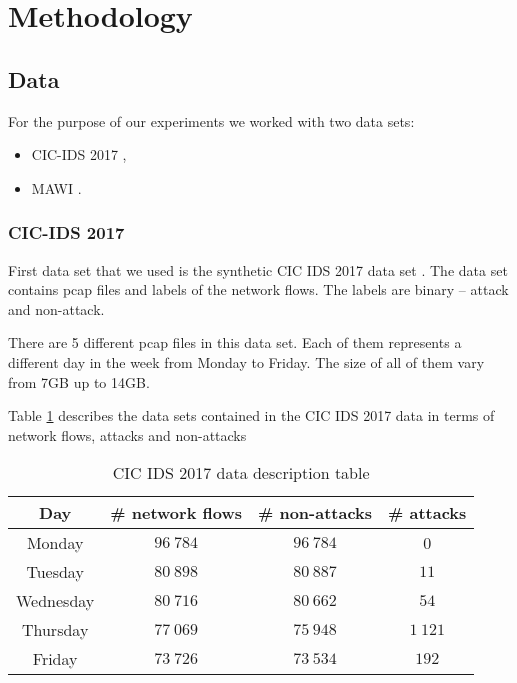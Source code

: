 \documentclass{article}
\begin{document}
\section{Methodology}
\subsection{Data}\label{sec-methodology-data}
For the purpose of our experiments we worked with two data sets:

\begin{itemize}
    \item CIC-IDS 2017 \cite{sharafaldin2018toward},
    \item MAWI \cite{mawilab}.
\end{itemize}

\subsubsection{CIC-IDS 2017}
First data set that we used is the synthetic CIC IDS 2017 data set \cite{sharafaldin2018toward}. The data set contains pcap files and labels of the network flows. The labels are binary -- attack and non-attack.

There are 5 different pcap files in this data set. Each of them represents a different day in the week from Monday to Friday. The size of all of them vary from 7GB up to 14GB.

Table \ref{tab:cic-ids2017-data-description} describes the data sets contained in the CIC IDS 2017 data in terms of network flows, attacks and non-attacks

\begin{table}[h!]
\centering
    \begin{tabular}{ |c|c|c|c| }
        \hline
        Day & \# network flows & \# non-attacks & \# attacks \\
        \hline
        Monday & $96\ 784$ & $96\ 784$ & 0 \\
        Tuesday & $80\ 898$ & $80\ 887$ & $11$ \\
        Wednesday & $80\ 716$ & $80\ 662$ & $54$ \\
        Thursday & $77\ 069$ & $75\ 948$ & $1\ 121$ \\
        Friday & $73\ 726$ & $73\ 534$ & $192$ \\
        \hline
    \end{tabular}
\caption{CIC IDS 2017 data description table}
\label{tab:cic-ids2017-data-description}
\end{table}
\end{document}
